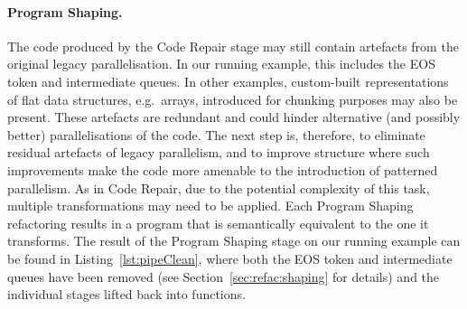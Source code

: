 


\paragraph{Program Shaping.}
The code produced by the Code Repair stage may still contain artefacts from the original legacy parallelisation. In our running example, this includes the EOS token and intermediate queues.
%
In other examples, custom-built representations of flat data structures, e.g.\ arrays, introduced for chunking purposes may also be present.
%
These artefacts are redundant and could hinder alternative (and possibly better) parallelisations of the code. The next step is, therefore, to eliminate residual artefacts of legacy parallelism, and to improve structure where such improvements make the code more amenable to the introduction of patterned parallelism.
%
As in Code Repair, due to the potential complexity of this task, multiple transformations may need to be applied.
%
Each Program Shaping refactoring results in a program that is semantically equivalent to the one it transforms.
%
The result of the Program Shaping stage on our running example can be found in Listing~\ref{lst:pipeClean}, where both the EOS token and intermediate queues have been removed (see Section~\ref{sec:refac:shaping} for details) and the individual stages lifted back into functions.

